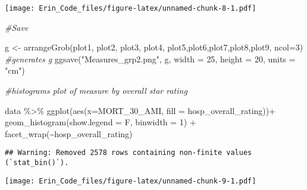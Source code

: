 \documentclass[
]{article}
\newenvironment{Shaded}{\begin{snugshade}}{\end{snugshade}}
\newcommand{\AttributeTok}[1]{\textcolor[rgb]{0.77,0.63,0.00}{#1}}
\newcommand{\CommentTok}[1]{\textcolor[rgb]{0.56,0.35,0.01}{\textit{#1}}}
\newcommand{\DecValTok}[1]{\textcolor[rgb]{0.00,0.00,0.81}{#1}}
\newcommand{\FunctionTok}[1]{\textcolor[rgb]{0.00,0.00,0.00}{#1}}
\newcommand{\NormalTok}[1]{#1}
\newcommand{\OtherTok}[1]{\textcolor[rgb]{0.56,0.35,0.01}{#1}}
\newcommand{\SpecialCharTok}[1]{\textcolor[rgb]{0.00,0.00,0.00}{#1}}
\newcommand{\StringTok}[1]{\textcolor[rgb]{0.31,0.60,0.02}{#1}}
\begin{document}
\texttt{[image: Erin\_Code\_files/figure-latex/unnamed-chunk-8-1.pdf]}

\begin{Shaded}
\begin{Highlighting}[]
\CommentTok{\#Save}

\NormalTok{g }\OtherTok{\textless{}{-}} \FunctionTok{arrangeGrob}\NormalTok{(plot1, plot2, plot3, plot4, plot5,plot6,plot7,plot8,plot9, }\AttributeTok{ncol=}\DecValTok{3}\NormalTok{) }\CommentTok{\#generates g}
\FunctionTok{ggsave}\NormalTok{(}\StringTok{"Measures\_grp2.png"}\NormalTok{, g, }\AttributeTok{width =} \DecValTok{25}\NormalTok{, }\AttributeTok{height =} \DecValTok{20}\NormalTok{, }\AttributeTok{units =} \StringTok{"cm"}\NormalTok{)}
\end{Highlighting}
\end{Shaded}

\begin{Shaded}
\begin{Highlighting}[]
\CommentTok{\#histograms plot of measure by overall star rating}

\NormalTok{data }\SpecialCharTok{\%\textgreater{}\%} \FunctionTok{ggplot}\NormalTok{(}\FunctionTok{aes}\NormalTok{(}\AttributeTok{x=}\NormalTok{MORT\_30\_AMI, }\AttributeTok{fill =}\NormalTok{ hosp\_overall\_rating))}\SpecialCharTok{+}
  \FunctionTok{geom\_histogram}\NormalTok{(}\AttributeTok{show.legend =}\NormalTok{ F, }\AttributeTok{binwidth =} \DecValTok{1}\NormalTok{) }\SpecialCharTok{+}
  \FunctionTok{facet\_wrap}\NormalTok{(}\SpecialCharTok{\textasciitilde{}}\NormalTok{hosp\_overall\_rating)}
\end{Highlighting}
\end{Shaded}

\begin{verbatim}
## Warning: Removed 2578 rows containing non-finite values (`stat_bin()`).
\end{verbatim}

\texttt{[image: Erin\_Code\_files/figure-latex/unnamed-chunk-9-1.pdf]}
\end{document}
